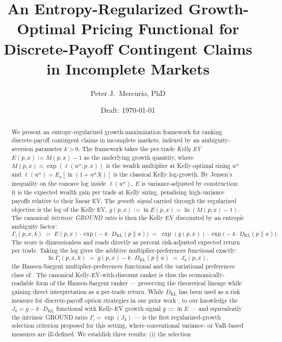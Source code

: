 \documentclass[11pt]{article}
\title{An Entropy-Regularized Growth-Optimal Pricing Functional for \\
       Discrete-Payoff Contingent Claims in Incomplete Markets}
\author{Peter J.~Mercurio, PhD}
\affil{\small \texttt{peter.mercurio@alumni.utoronto.ca}}
\date{Draft: \today}
\theoremstyle{definition}
\theoremstyle{remark}
\newcommand{\KL}{D_{\mathrm{KL}}}
\newcommand{\GROUND}{\Gamma_{\mathrm{i}}}
\begin{document}
\maketitle

\begin{abstract}
We present an entropy-regularized growth-maximization framework for
ranking discrete-payoff contingent claims in incomplete markets,
indexed by an ambiguity-aversion parameter $k > 0$. The framework
takes the per-trade \emph{Kelly EV} $E(p, x) := M(p, x) - 1$ as the
underlying growth quantity, where $M(p, x) = \exp(\ell(w^\star; p, x))$
is the wealth multiplier at Kelly-optimal sizing $w^\star$ and
$\ell(w^\star) = E_p[\ln(1 + w^\star X)]$ is the classical Kelly
log-growth. By Jensen's inequality on the concave log inside
$\ell(w^\star)$, $E$ is variance-adjusted by construction: it is the
expected wealth gain per trade at Kelly sizing, penalising
high-variance payoffs relative to their linear EV. The \emph{growth
signal} carried through the regularized objective is the log of the
Kelly EV, $g(p, x) := \ln E(p, x) = \ln(M(p, x) - 1)$. The canonical
\emph{intrinsic GROUND ratio} is then the Kelly EV discounted by an
entropic ambiguity factor:
\begin{equation*}
\GROUND(p, x, k) \;=\; E(p, x) \cdot \exp\!\bigl(-k \cdot \KL(p \| u)\bigr)
\;=\; \exp(g(p, x)) \cdot \exp\!\bigl(-k \cdot \KL(p \| u)\bigr).
\end{equation*}
The score is dimensionless and reads directly as percent risk-adjusted
expected return per trade. Taking the log gives the additive
multiplier-preferences functional exactly:
\[
\ln \GROUND(p, x, k) \;=\; g(p, x) - k \cdot \KL(p \| u) \;=\; J_k(p, x),
\]
the Hansen-Sargent multiplier-preferences functional
\citep{hansen2008robustness} and the variational preferences class of
\citet{maccheroni2006ambiguity}. The canonical Kelly-EV-with-discount
ranker is thus the economically-readable form of the Hansen-Sargent
ranker --- preserving the theoretical lineage while gaining direct
interpretation as a per-trade return. While $\KL$ has been used as a
risk measure for discrete-payoff option strategies in our prior work
\citep{mercurio2020binary,mercurio2020}, to our knowledge the
$J_k = g - k \cdot \KL$ functional with Kelly-EV growth signal
$g := \ln E$ --- and equivalently the intrinsic GROUND ratio
$\GROUND = \exp(J_k)$ --- is the first regularized-growth selection
criterion proposed for this setting, where conventional variance- or
VaR-based measures are ill-defined. We establish three results: (i) the selection

\end{abstract}
\end{document}
